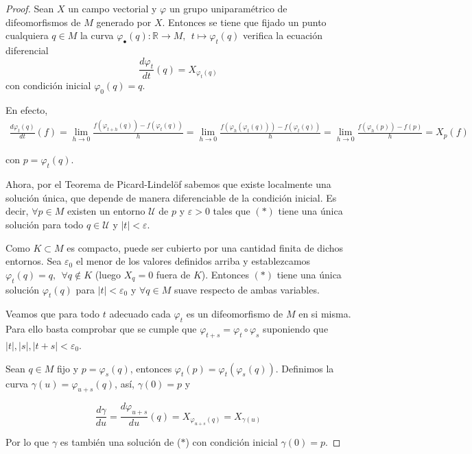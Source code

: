 \begin{proof}
    Sean $X$ un campo vectorial y $\varphi$ un grupo uniparamétrico de difeomorfismos de $M$ generado por $X$. Entonces se tiene que fijado un punto cualquiera $q\in M$ la curva $\varphi_\bullet(q): \mathbb{R}\to M,~~ t\mapsto \varphi_t(q)$ verifica la ecuación diferencial
    \begin{equation*}
        \frac{d\varphi_t}{dt}(q)=X_{\varphi_t(q)}\tag{$\ast$}
    \end{equation*}
    con condición inicial $\varphi_0(q)=q$.

    En efecto,
    \begin{align*}
        \frac{d\varphi_t(q)}{dt}(f)=\lim_{h\to 0} \frac{f(\varphi_{t+h}(q))- f(\varphi_t(q))}{h} = \lim_{h\to 0} \frac{f(\varphi_{h}(\varphi_t(q)))- f(\varphi_t(q))}{h} = \lim_{h\to 0} \frac{f(\varphi_{h}(p))- f(p)}{h} = X_p(f)
    \end{align*}

    con $p=\varphi_t(q)$.

    Ahora, por el Teorema de Picard-Lindelöf sabemos que existe localmente una solución única, que depende de manera diferenciable de la condición inicial. Es decir, $\forall p\in M$ existen un entorno $\mathcal{U}$ de $p$ y $\varepsilon > 0$ tales que $(\ast)$ tiene una única solución para todo $q\in \mathcal{U}$ y $|t|<\varepsilon$.

    Como $K\subset M$ es compacto, puede ser cubierto por una cantidad finita de dichos entornos. Sea $\varepsilon_0$ el menor de los valores definidos arriba y establezcamos $\varphi_t(q)=q,~~\forall q\notin K$ (luego $X_q=0$ fuera de $K$). Entonces $(\ast)$ tiene una única solución $\varphi_t(q)$ para $|t|<\varepsilon_0$ y $\forall q\in M$ suave respecto de ambas variables.

    Veamos que para todo $t$ adecuado cada $\varphi_t$ es un difeomorfismo de $M$ en si misma. Para ello basta comprobar que se cumple que $\varphi_{t+s}=\varphi_t\circ \varphi_s$ suponiendo que $|t|,|s|,|t+s|<\varepsilon_0$.

    Sean $q\in M$ fijo y  $p=\varphi_s(q)$, entonces $\varphi_t(p)=\varphi_t(\varphi_s(q))$. Definimos la curva $\gamma(u)=\varphi_{u+s}(q)$, así, $\gamma(0)=p$ y 
    
    \begin{equation*}
        \frac{d\gamma}{du}=\frac{d\varphi_{u+s}}{du}(q)=X_{\varphi_{u+s}(q)}=X_{\gamma (u)}
    \end{equation*} 
    
    Por lo que $\gamma$ es también una solución de ($\ast$) con condición inicial $\gamma(0)=p$.


\end{proof}
